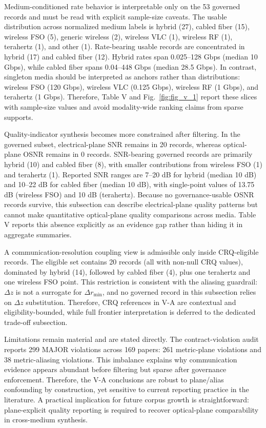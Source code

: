 Medium-conditioned rate behavior is interpretable only on the 53 governed records and must be read with explicit sample-size caveats. The usable distribution across normalized medium labels is hybrid (27), cabled fiber (15), wireless FSO (5), generic wireless (2), wireless VLC (1), wireless RF (1), terahertz (1), and other (1). Rate-bearing usable records are concentrated in hybrid (17) and cabled fiber (12). Hybrid rates span 0.025--128 Gbps (median 10 Gbps), while cabled fiber spans 0.04--448 Gbps (median 28.5 Gbps). In contrast, singleton media should be interpreted as anchors rather than distributions: wireless FSO (120 Gbps), wireless VLC (0.125 Gbps), wireless RF (1 Gbps), and terahertz (1 Gbps). Therefore, Table V and Fig.~\ref{fig:fig_v_1} report these slices with sample-size values and avoid modality-wide ranking claims from sparse supports.

Quality-indicator synthesis becomes more constrained after filtering. In the governed subset, electrical-plane SNR remains in 20 records, whereas optical-plane OSNR remains in 0 records. SNR-bearing governed records are primarily hybrid (10) and cabled fiber (8), with smaller contributions from wireless FSO (1) and terahertz (1). Reported SNR ranges are 7--20 dB for hybrid (median 10 dB) and 10--22 dB for cabled fiber (median 10 dB), with single-point values of 13.75 dB (wireless FSO) and 10 dB (terahertz). Because no governance-usable OSNR records survive, this subsection can describe electrical-plane quality patterns but cannot make quantitative optical-plane quality comparisons across media. Table V reports this absence explicitly as an evidence gap rather than hiding it in aggregate summaries.

A communication-resolution coupling view is admissible only inside CRQ-eligible records. The eligible set contains 20 records (all with non-null CRQ values), dominated by hybrid (14), followed by cabled fiber (4), plus one terahertz and one wireless FSO point. This restriction is consistent with the aliasing guardrail: $\Delta z$ is not a surrogate for $\Delta r_{\min}$, and no governed record in this subsection relies on $\Delta z$ substitution. Therefore, CRQ references in V-A are contextual and eligibility-bounded, while full frontier interpretation is deferred to the dedicated trade-off subsection.

Limitations remain material and are stated directly. The contract-violation audit reports 299 MAJOR violations across 169 papers: 261 metric-plane violations and 38 metric-aliasing violations. This imbalance explains why communication evidence appears abundant before filtering but sparse after governance enforcement. Therefore, the V-A conclusions are robust to plane/alias confounding by construction, yet sensitive to current reporting practice in the literature. A practical implication for future corpus growth is straightforward: plane-explicit quality reporting is required to recover optical-plane comparability in cross-medium synthesis.

